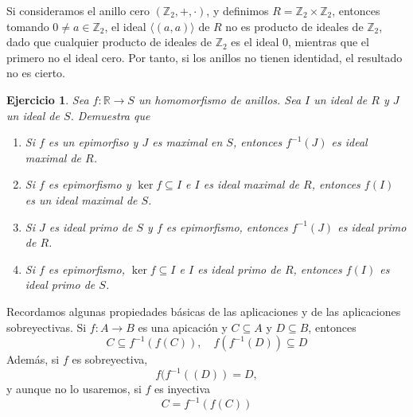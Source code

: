 \documentclass[11pt]{book}
\def\R{\mathbb{R}}
\def\Z{\mathbb{Z}}
\newtheorem{ej}{Ejercicio}
\theoremstyle{definition}
\begin{document}
Si consideramos el anillo cero $(\Z_2,+,\cdot)$, y definimos $R=\Z_2\times \Z_2$, entonces tomando $0\neq a\in\Z_2$, el ideal $\langle(a,a)\rangle$ de $R$ no es producto de ideales de $\Z_2$, dado que cualquier producto de ideales de $\Z_2$ es el ideal 0, mientras que el primero no el ideal cero. Por tanto, si los anillos no tienen identidad, el resultado no es cierto.

\begin{ej}
    Sea $f:\R\longrightarrow S$ un homomorfismo de anillos. Sea $I$ un ideal de $R$ y $J$ un ideal de $S$. Demuestra que\begin{enumerate}
        \item Si $f$ es un epimorfiso y $J$ es maximal en $S$, entonces $f^{-1}(J)$ es ideal maximal de $R$.
        \item Si $f$ es epimorfismo y $\ker f\subseteq I$ e $I$ es ideal maximal de $R$, entonces $f(I)$ es un ideal maximal de $S$.
        \item Si $J$ es ideal primo de $S$ y $f$ es epimorfismo, entonces $f^{-1}(J)$ es ideal primo de $R$.
        \item Si $f$ es epimorfismo, $\ker f\subseteq I$ e $I$ es ideal primo de $R$, entonces $f(I)$ es ideal primo de $S$.
    \end{enumerate}
\end{ej}
\noindent Recordamos algunas propiedades básicas de las aplicaciones y de las aplicaciones sobreyectivas. Si $f:A\longrightarrow B$ es una apicación y $C\subseteq A$ y $D\subseteq B$, entonces\[
    C\subseteq f^{-1}(f(C)),\quad f(f^{-1}(D))\subseteq D
\]Además, si $f$ es sobreyectiva,\[
f(f^{-1}((D))=D,
\]y aunque no lo usaremos, si $f$ es inyectiva\[
C=f^{-1}(f(C))
\]
\end{document}
